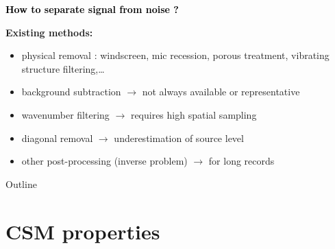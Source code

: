 \documentclass[10pt,xcolor=x11names,compress, show notes]{beamer}%
\begin{document}
\begin{frame}[t]{\insertsectionhead}
	\begin{center}
		\textcolor{black}{\bfseries \centering  How to separate signal from noise ?}
	\end{center}
	\vfill

{ \bfseries Existing methods:}
	\begin{itemize}
        		\item physical removal : windscreen, mic recession, porous treatment, vibrating structure filtering,\dots
        		\item background subtraction $\rightarrow$ not always available or representative
        		\item wavenumber filtering $\rightarrow$ requires high spatial sampling
        		\item diagonal removal $\rightarrow$ underestimation of source level
        		\item other post-processing (inverse problem) $\rightarrow$ for long records
	\end{itemize}

	\vfill
{}
\end{frame}

\begin{frame}{Outline}
	\tableofcontents[]
\end{frame}

\section{CSM properties}
\end{document}

